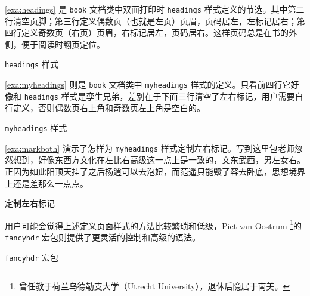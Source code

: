 \autoref{exa:headings} 是 \texttt{book} 文档类中双面打印时 \texttt{headings} 样式定义的节选。其中第二行清空页脚；第三行定义偶数页（也就是左页）页眉，页码居左，左标记居右；第四行定义奇数页（右页）页眉，右标记居左，页码居右。这样页码总是在书的外侧，便于阅读时翻页定位。 

\begin{example}[h]
\begin{Code}[]
\def\ps@headings{%
    \let\@oddfoot\@empty\let\@evenfoot\@empty
    \def\@evenhead{\thepage\hfil\slshape\leftmark}%
    \def\@oddhead{{\slshape\rightmark}\hfil\thepage}%
    ...
\end{Code}
\caption{\texttt{headings} 样式}
\label{exa:headings}
\end{example}

\autoref{exa:myheadings} 则是 \texttt{book} 文档类中 \texttt{myheadings} 样式的定义。只看前四行它好像和 \texttt{headings} 样式是孪生兄弟，差别在于下面三行清空了左右标记，用户需要自行定义，否则偶数页右上角和奇数页左上角是空白的。

\begin{example}[h]
\begin{Code}[]
\def\ps@myheadings{%
    \let\@oddfoot\@empty\let\@evenfoot\@empty
    \def\@evenhead{\thepage\hfil\slshape\leftmark}%
    \def\@oddhead{{\slshape\rightmark}\hfil\thepage}%
    \let\@mkboth\@gobbletwo
    \let\chaptermark\@gobble
    \let\sectionmark\@gobble
}
\end{Code}
\caption{\texttt{myheadings} 样式}
\label{exa:myheadings}
\end{example}

\autoref{exa:markboth} 演示了怎样为 \texttt{myheadings} 样式定制左右标记。写到这里包老师忽然想到，好像东西方文化在左比右高级这一点上是一致的，文东武西，男左女右。正因为如此阳顶天挂了之后杨逍可以去泡妞，而范遥只能毁了容去卧底，思想境界上还是差那么一点点。

\begin{example}[h]
\caption{定制左右标记}
\label{exa:markboth}
\end{example}

用户可能会觉得上述定义页面样式的方法比较繁琐和低级，Piet van Oostrum\indexOostrum{} \footnote{曾任教于荷兰乌德勒支大学（Utrecht University），退休后隐居于南美。}的 \texttt{fancyhdr} 宏包\citep{Oostrum_2004}则提供了更灵活的控制和高级的语法。

\begin{example}[!h]
\caption{\texttt{fancyhdr} 宏包}
\label{exa:fancyhdr}
\end{example}

